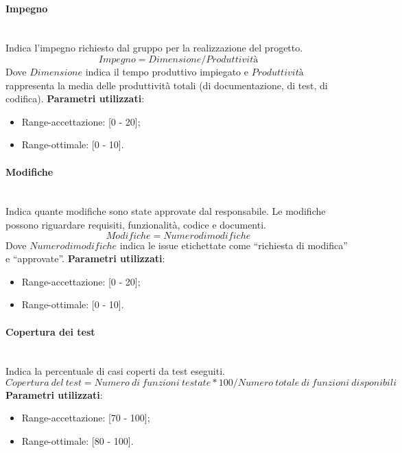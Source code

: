 			\paragraph{Impegno} \mbox{} \\

			Indica l'impegno richiesto dal gruppo per la realizzazione del progetto.
			\[
			Impegno = Dimensione / Produttività
			\]
			Dove $Dimensione$ indica il tempo produttivo impiegato e $Produttività$ rappresenta la media delle produttività totali (di documentazione, di test, di codifica).
			\textbf{Parametri utilizzati}:
			\begin{itemize}
				\item Range-accettazione: [0 - 20];
				\item Range-ottimale: [0 - 10].
			\end{itemize}

			\paragraph{Modifiche} \mbox{} \\

			Indica quante modifiche sono state approvate dal responsabile. Le modifiche possono riguardare requisiti, funzionalità, codice e documenti.
			\[
			Modifiche = Numero di modifiche
			\]
			Dove $Numero di modifiche$ indica le issue etichettate come ``richiesta di modifica'' e ``approvate''.
			\textbf{Parametri utilizzati}:
			\begin{itemize}
				\item Range-accettazione: [0 - 20];
				\item Range-ottimale: [0 - 10].
			\end{itemize}

			\paragraph{Copertura dei test} \mbox{} \\

			Indica la percentuale di casi coperti da test eseguiti.
			\[
			Copertura\ del\ test = Numero\ di\ funzioni\ testate * 100 / Numero\ totale\ di\ funzioni\ disponibili
			\]
			\textbf{Parametri utilizzati}:
			\begin{itemize}
				\item Range-accettazione: [70 - 100];
				\item Range-ottimale: [80 - 100].
			\end{itemize}
			
